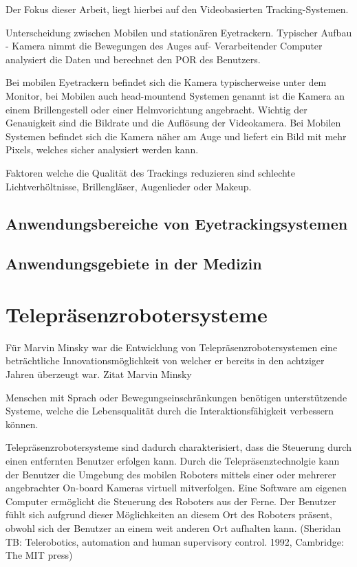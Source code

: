 Der Fokus dieser Arbeit, liegt hierbei auf den Videobasierten Tracking-Systemen.


Unterscheidung zwischen Mobilen und stationären Eyetrackern.
Typischer Aufbau - Kamera nimmt die Bewegungen des Auges auf- Verarbeitender Computer analysiert die Daten und berechnet den POR des Benutzers.

Bei mobilen Eyetrackern befindet sich die Kamera typischerweise unter dem Monitor, bei Mobilen auch head-mountend Systemen genannt ist die Kamera an einem Brillengestell oder einer Helmvorichtung angebracht.
Wichtig \bzgl der Genauigkeit sind die Bildrate und die Auflösung der Videokamera.
Bei Mobilen Systemen befindet sich die Kamera näher am Auge und liefert ein Bild mit mehr Pixels, welches sicher analysiert werden kann.

Faktoren welche die Qualität des Trackings reduzieren sind schlechte Lichtverhöltnisse, Brillengläser, Augenlieder oder Makeup.


\subsection{Anwendungsbereiche von Eyetrackingsystemen}
\label{section:XXX}
\subsection{Anwendungsgebiete in der Medizin}
\label{section:XXX}


\section{Telepräsenzrobotersysteme}
\label{section:XXX}

Für Marvin Minsky war die Entwicklung von Telepräsenzrobotersystemen eine beträchtliche Innovationsmöglichkeit von welcher er bereits in den achtziger Jahren überzeugt war. Zitat Marvin Minsky

Menschen mit Sprach oder Bewegungseinschränkungen benötigen unterstützende Systeme, welche die Lebensqualität durch die Interaktionsfähigkeit verbessern können.

Telepräsenzrobotersysteme sind dadurch charakterisiert, dass die Steuerung durch einen entfernten Benutzer erfolgen kann. Durch die Telepräsenztechnolgie kann der Benutzer die Umgebung des mobilen Roboters mittels einer oder mehrerer angebrachter On-board Kameras virtuell mitverfolgen. Eine Software am eigenen Computer ermöglicht die Steuerung des Roboters aus der Ferne. Der Benutzer fühlt sich aufgrund dieser Möglichkeiten an diesem Ort des Roboters präsent, obwohl sich der Benutzer an einem weit anderen Ort aufhalten kann. (Sheridan TB: Telerobotics, automation and human supervisory control. 1992, Cambridge: The MIT press)

